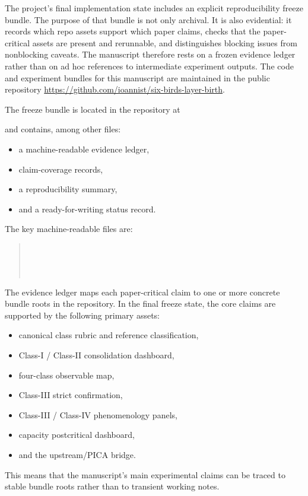 \documentclass[11pt]{article}
\begin{document}
The project's final implementation state includes an explicit reproducibility freeze bundle. The purpose of that bundle is not only archival. It is also evidential: it records which repo assets support which paper claims, checks that the paper-critical assets are present and rerunnable, and distinguishes blocking issues from nonblocking caveats. The manuscript therefore rests on a frozen evidence ledger rather than on ad hoc references to intermediate experiment outputs.
The code and experiment bundles for this manuscript are maintained in the public repository \url{https://github.com/ioannist/six-birds-layer-birth}.

The freeze bundle is located in the repository at
\begin{quote}
\end{quote}
and contains, among other files:
\begin{itemize}
    \item a machine-readable evidence ledger,
    \item claim-coverage records,
    \item a reproducibility summary,
    \item and a ready-for-writing status record.
\end{itemize}
The key machine-readable files are:
\begin{quote}
\\
\\
\\
\end{quote}

The evidence ledger maps each paper-critical claim to one or more concrete bundle roots in the repository. In the final freeze state, the core claims are supported by the following primary assets:
\begin{itemize}
    \item canonical class rubric and reference classification,
    \item Class-I / Class-II consolidation dashboard,
    \item four-class observable map,
    \item Class-III strict confirmation,
    \item Class-III / Class-IV phenomenology panels,
    \item capacity postcritical dashboard,
    \item and the upstream/PICA bridge.
\end{itemize}
This means that the manuscript's main experimental claims can be traced to stable bundle roots rather than to transient working notes.
\end{document}
